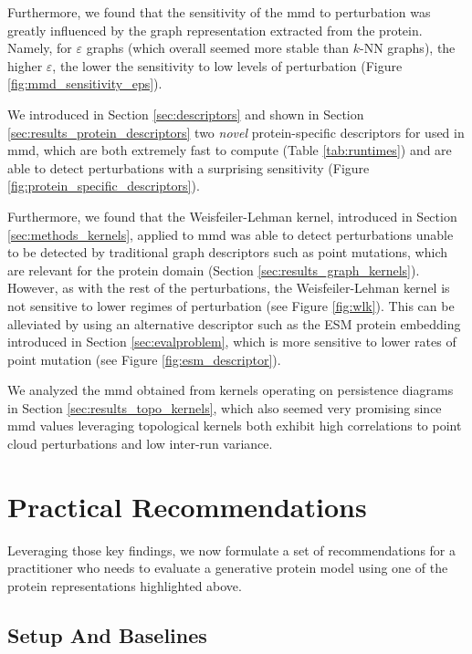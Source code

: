 Furthermore, we found that the sensitivity of the \acrshort{mmd} to perturbation was
greatly influenced by the graph representation extracted from the protein.
Namely, for $\varepsilon$ graphs (which overall seemed more stable than $k$-NN
graphs), the higher $\varepsilon$, the lower the sensitivity to low levels of
perturbation (Figure \ref{fig:mmd_sensitivity_eps}).

We introduced in Section \ref{sec:descriptors} and shown in Section
\ref{sec:results_protein_descriptors} two \emph{novel} protein-specific descriptors for
used in \acrshort{mmd}, which are both extremely fast to compute (Table \ref{tab:runtimes})
and are able to detect perturbations with a surprising sensitivity (Figure
\ref{fig:protein_specific_descriptors}).

Furthermore, we found that the Weisfeiler-Lehman kernel, introduced in Section
\ref{sec:methods_kernels}, applied to \acrshort{mmd} was able to detect perturbations
unable to be detected by traditional graph descriptors such as point mutations,
which are relevant for the protein domain (Section
\ref{sec:results_graph_kernels}). However, as with the rest of the perturbations,
the Weisfeiler-Lehman kernel is not sensitive to lower regimes of perturbation
(see Figure \ref{fig:wlk}).
This can be alleviated by using an alternative descriptor such as the ESM
protein embedding introduced in Section \ref{sec:evalproblem}, which is more
sensitive to lower rates of point mutation (see Figure
\ref{fig:esm_descriptor}).

We analyzed the \acrshort{mmd} obtained from kernels operating on persistence diagrams in
Section \ref{sec:results_topo_kernels}, which also seemed very promising since
\acrshort{mmd} values leveraging topological kernels both exhibit high correlations to
point cloud perturbations and low inter-run variance.

\section{Practical Recommendations}\label{sec:discussion_recommendations}

Leveraging those key findings, we now formulate a set of recommendations for a
practitioner who needs to evaluate a generative protein model using one of the
protein representations highlighted above.


\subsection{Setup And Baselines}\label{sec:discussion_baselines}

